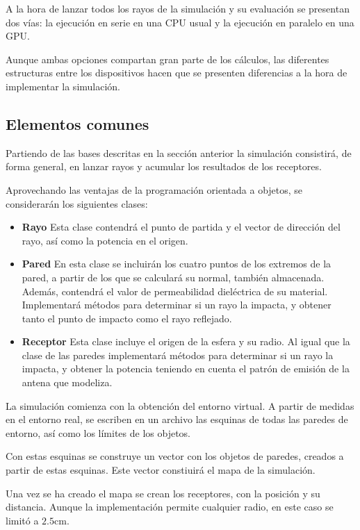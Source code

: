 A la hora de lanzar todos los rayos de la simulación y su evaluación se presentan dos vías: la ejecución en serie en una CPU usual y la ejecución en paralelo en una GPU.

Aunque ambas opciones compartan gran parte de los cálculos, las diferentes estructuras entre los dispositivos hacen que se presenten diferencias a la hora de implementar la simulación.

\subsection{Elementos comunes}

Partiendo de las bases descritas en la sección anterior la simulación consistirá, de forma general, en lanzar rayos y acumular los resultados de los receptores.

Aprovechando las ventajas de la programación orientada a objetos, se considerarán los siguientes clases:
\begin{itemize}
    \item \textbf{Rayo} Esta clase contendrá el punto de partida y el vector de dirección del rayo, así como la potencia en el origen.
    \item \textbf{Pared} En esta clase se incluirán los cuatro puntos de los extremos de la pared, a partir de los que se calculará su normal, también almacenada. Además, contendrá el valor de permeabilidad dieléctrica de su material. Implementará métodos para determinar si un rayo la impacta, y obtener tanto el punto de impacto como el rayo reflejado.
    \item \textbf{Receptor} Esta clase incluye el origen de la esfera y su radio. Al igual que la clase de las paredes implementará métodos para determinar si un rayo la impacta, y obtener la potencia teniendo en cuenta el patrón de emisión de la antena que modeliza.
\end{itemize}

La simulación comienza con la obtención del entorno virtual.
A partir de medidas en el entorno real, se escriben en un archivo las esquinas de todas las paredes de entorno, así como los límites de los objetos.

Con estas esquinas se construye un vector con los objetos de paredes, creados a partir de estas esquinas.
Este vector constiuirá el mapa de la simulación.

Una vez se ha creado el mapa se crean los receptores, con la posición y su distancia.
Aunque la implementación permite cualquier radio, en este caso se limitó a $2.5$cm.

